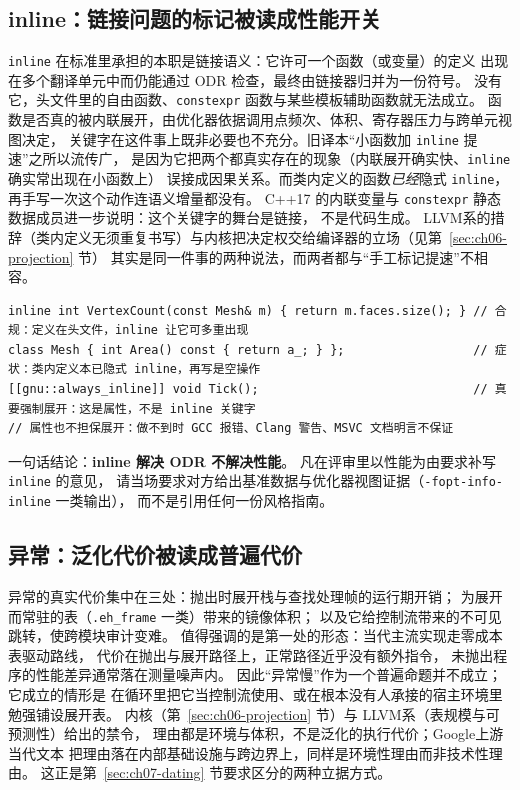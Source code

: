\documentclass[12pt,a4paper,fontset=fandol]{ctexbook}
\newcommand{\cpp}[1]{C++#1}
\newcommand{\Tp}[1]{\texttt{#1}}
\newcommand{\Lang}[1]{\textsf{#1}}
\newcommand{\DomGo}{\Lang{Google}}
\newcommand{\DomLlvm}{\Lang{LLVM}}
\begin{document}
\subsection{inline：链接问题的标记被读成性能开关}
\label{sec:apx-inline}

\Tp{inline} 在标准里承担的本职是链接语义：它许可一个函数（或变量）的定义
出现在多个翻译单元中而仍能通过 ODR 检查，最终由链接器归并为一份符号。
没有它，头文件里的自由函数、\Tp{constexpr} 函数与某些模板辅助函数就无法成立。
函数是否真的被内联展开，由优化器依据调用点频次、体积、寄存器压力与跨单元视图决定，
关键字在这件事上既非必要也不充分。旧译本``小函数加 \Tp{inline} 提速''之所以流传广，
是因为它把两个都真实存在的现象（内联展开确实快、\Tp{inline} 确实常出现在小函数上）
误接成因果关系。而类内定义的函数\emph{已经}隐式 \Tp{inline}，
再手写一次这个动作连语义增量都没有。
\cpp{17} 的内联变量与 \Tp{constexpr} 静态数据成员进一步说明：这个关键字的舞台是链接，
不是代码生成。
\DomLlvm 系的措辞（类内定义无须重复书写）与内核把决定权交给编译器的立场（见第~\ref{sec:ch06-projection} 节）
其实是同一件事的两种说法，而两者都与``手工标记提速''不相容。

\begin{lstlisting}[style=cppstyle,caption={inline：合规用法与症状用法并置},label={lst:apx-inline}]
inline int VertexCount(const Mesh& m) { return m.faces.size(); } // 合规：定义在头文件，inline 让它可多重出现
class Mesh { int Area() const { return a_; } };                  // 症状：类内定义本已隐式 inline，再写是空操作
[[gnu::always_inline]] void Tick();                              // 真要强制展开：这是属性，不是 inline 关键字
// 属性也不担保展开：做不到时 GCC 报错、Clang 警告、MSVC 文档明言不保证
\end{lstlisting}

一句话结论：\textbf{inline 解决 ODR 不解决性能}。
凡在评审里以性能为由要求补写 \Tp{inline} 的意见，
请当场要求对方给出基准数据与优化器视图证据（\Tp{-fopt-info-inline} 一类输出），
而不是引用任何一份风格指南。

\subsection{异常：泛化代价被读成普遍代价}
\label{sec:apx-exception}

异常的真实代价集中在三处：抛出时展开栈与查找处理帧的运行期开销；
为展开而常驻的表（\Tp{.eh\_frame} 一类）带来的镜像体积；
以及它给控制流带来的不可见跳转，使跨模块审计变难。
值得强调的是第一处的形态：当代主流实现走零成本表驱动路线，
代价在抛出与展开路径上，正常路径近乎没有额外指令，
未抛出程序的性能差异通常落在测量噪声内。
因此``异常慢''作为一个普遍命题并不成立；它成立的情形是
在循环里把它当控制流使用、或在根本没有人承接的宿主环境里勉强铺设展开表。
内核（第~\ref{sec:ch06-projection} 节）与 \DomLlvm 系（表规模与可预测性）给出的禁令，
理由都是环境与体积，不是泛化的执行代价；\DomGo 上游当代文本
把理由落在内部基础设施与跨边界上，同样是环境性理由而非技术性理由。
这正是第~\ref{sec:ch07-dating} 节要求区分的两种立据方式。
\end{document}
